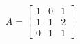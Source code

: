 \documentclass[preview]{standalone}
\begin{document}
\begin{align*}
A = \begin{bmatrix} 1 & 0 & 1 \\ 1 & 1 & 2 \\ 0 & 1 & 1 \end{bmatrix}
\end{align*}
\end{document}
